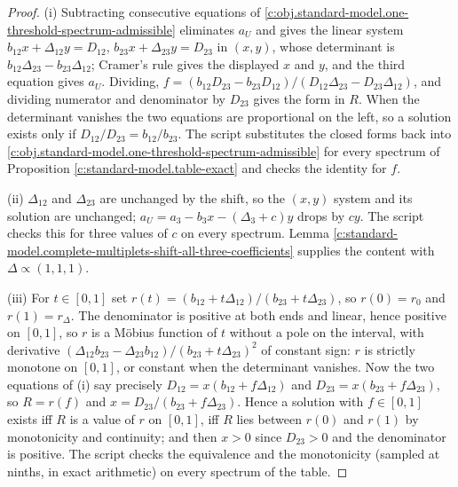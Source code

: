 \documentclass[11pt]{article}
\theoremstyle{definition}
\theoremstyle{plain}
\providecommand{\Dl}{}\renewcommand{\Dl}{\Delta}
\begin{document}
\begin{proof}
(i) Subtracting consecutive equations of \ref{c:obj.standard-model.one-threshold-spectrum-admissible} eliminates $a_{U}$ and gives the linear system $b_{12}x + \Dl_{12}y = D_{12}$, $b_{23}x + \Dl_{23}y = D_{23}$ in $(x, y)$, whose determinant is $b_{12}\Dl_{23} - b_{23}\Dl_{12}$; Cramer's rule gives the displayed $x$ and $y$, and the third equation gives $a_{U}$. Dividing, $f = (b_{12}D_{23} - b_{23}D_{12})/(D_{12}\Dl_{23} - D_{23}\Dl_{12})$, and dividing numerator and denominator by $D_{23}$ gives the form in $R$. When the determinant vanishes the two equations are proportional on the left, so a solution exists only if $D_{12}/D_{23} = b_{12}/b_{23}$. The script substitutes the closed forms back into \ref{c:obj.standard-model.one-threshold-spectrum-admissible} for every spectrum of Proposition \ref{c:standard-model.table-exact} and checks the identity for $f$.

(ii) $\Dl_{12}$ and $\Dl_{23}$ are unchanged by the shift, so the $(x, y)$ system and its solution are unchanged; $a_{U} = a_{3} - b_{3}x - (\Dl_{3} + c)y$ drops by $cy$. The script checks this for three values of $c$ on every spectrum. Lemma \ref{c:standard-model.complete-multiplets-shift-all-three-coefficients} supplies the content with $\Dl \propto (1,1,1)$.

(iii) For $t \in [0, 1]$ set $r(t) = (b_{12} + t\Dl_{12})/(b_{23} + t\Dl_{23})$, so $r(0) = r_{0}$ and $r(1) = r_{\Dl}$. The denominator is positive at both ends and linear, hence positive on $[0, 1]$, so $r$ is a M\"obius function of $t$ without a pole on the interval, with derivative $(\Dl_{12}b_{23} - \Dl_{23}b_{12})/(b_{23} + t\Dl_{23})^{2}$ of constant sign: $r$ is strictly monotone on $[0, 1]$, or constant when the determinant vanishes. Now the two equations of (i) say precisely $D_{12} = x(b_{12} + f\Dl_{12})$ and $D_{23} = x(b_{23} + f\Dl_{23})$, so $R = r(f)$ and $x = D_{23}/(b_{23} + f\Dl_{23})$. Hence a solution with $f \in [0, 1]$ exists iff $R$ is a value of $r$ on $[0, 1]$, iff $R$ lies between $r(0)$ and $r(1)$ by monotonicity and continuity; and then $x > 0$ since $D_{23} > 0$ and the denominator is positive. The script checks the equivalence and the monotonicity (sampled at ninths, in exact arithmetic) on every spectrum of the table.

\end{proof}
\end{document}
